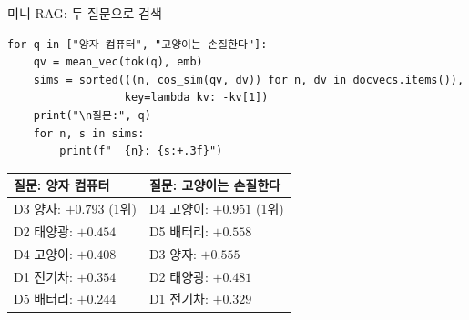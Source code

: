 \begin{frame}[fragile]{미니 RAG: 두 질문으로 검색}
\begin{lstlisting}
for q in ["양자 컴퓨터", "고양이는 손질한다"]:
    qv = mean_vec(tok(q), emb)
    sims = sorted(((n, cos_sim(qv, dv)) for n, dv in docvecs.items()),
                  key=lambda kv: -kv[1])
    print("\n질문:", q)
    for n, s in sims:
        print(f"  {n}: {s:+.3f}")
\end{lstlisting}
  \small
  \begin{tabular}{@{}ll@{}}
    \toprule
    질문: 양자 컴퓨터 & 질문: 고양이는 손질한다 \\
    \midrule
    D3 양자: $+0.793$ \; (1위) & D4 고양이: $+0.951$ \; (1위) \\
    D2 태양광: $+0.454$ & D5 배터리: $+0.558$ \\
    D4 고양이: $+0.408$ & D3 양자: $+0.555$ \\
    D1 전기차: $+0.354$ & D2 태양광: $+0.481$ \\
    D5 배터리: $+0.244$ & D1 전기차: $+0.329$ \\
    \bottomrule
  \end{tabular}
  

\end{frame}
